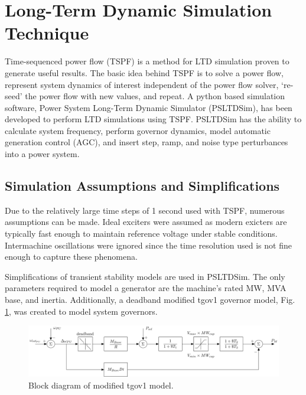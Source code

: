 \section{Long-Term Dynamic Simulation Technique}
Time-sequenced power flow (TSPF) is a method for LTD simulation proven to generate useful results\cite{DonnellyVoltageControl}.
The basic idea behind TSPF is to solve a power flow, represent system dynamics of interest independent of the power flow solver, `re-seed' the power flow with new values, and repeat.
A python based simulation software, Power System Long-Term Dynamic Simulator (PSLTDSim), has been developed to perform LTD simulations using TSPF.
PSLTDSim has the ability to calculate system frequency, perform governor dynamics, model automatic generation control (AGC), and insert step, ramp, and noise type perturbances into a power system.

\subsection{Simulation Assumptions and Simplifications}
Due to the relatively large time steps of 1 second used with TSPF, numerous assumptions can be made.
Ideal exciters were assumed as modern exicters are typically fast enough to maintain reference voltage under stable conditions.
Intermachine oscillations were ignored since the time resolution used is not fine enough to capture these phenomena.

Simplifications of transient stability models are used in PSLTDSim.
The only parameters required to model a generator are the machine's rated MW, MVA base, and inertia.
Additionally, a deadband modified tgov1 governor model, Fig. \ref{fig: tgov1BlockDiagram},  was created to model system governors.

\begin{figure}[!ht]
	\centering
	\includegraphics[width=\linewidth]{figures/tgov1DB}
	\caption{Block diagram of modified tgov1 model.}
	\label{fig: tgov1BlockDiagram}
\end{figure}

